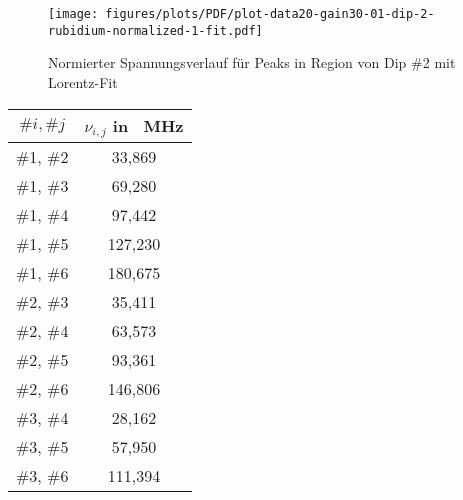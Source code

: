 \begin{figure}[H]
    \centering
    \texttt{[image: figures/plots/PDF/plot-data20-gain30-01-dip-2-rubidium-normalized-1-fit.pdf]}
    \caption{Normierter Spannungsverlauf für Peaks in Region von Dip \textcolor{green!50!black}{\#2} mit Lorentz-Fit}
    \label{fig:plot-data20-gain30-01-dip-2-rubidium-normalized-1-fit}
\end{figure}

\begin{table}[H]
    \begin{minipage}{8cm}
        \centering
        \begin{tabular}{|c|c|}
            \hline
            $\#i, \#j$      &       $\nu_{i,j}$ in \SI{}{\mega \hertz} \\
            \hline
            \hline
            \cellcolor{green!40} \#1, \#2       &   \cellcolor{green!40}     33,869         \\
            \hline
            \cellcolor{red!20}   \#1, \#3       &   \cellcolor{red!20}       69,280         \\
            \hline
            \cellcolor{gray!20}  \#1, \#4       &   \cellcolor{gray!20}      97,442         \\
            \hline
            \cellcolor{red!20}   \#1, \#5       &   \cellcolor{red!20}      127,230         \\
            \hline
            \cellcolor{gray!20}  \#1, \#6       &   \cellcolor{gray!20}     180,675         \\
            \hline
            \cellcolor{red!20}   \#2, \#3       &   \cellcolor{red!20}       35,411         \\
            \hline
            \cellcolor{green!40} \#2, \#4       &   \cellcolor{green!40}     63,573         \\
            \hline
            \cellcolor{red!20}   \#2, \#5       &   \cellcolor{red!20}       93,361         \\
            \hline
            \cellcolor{gray!20}  \#2, \#6       &   \cellcolor{gray!20}     146,806         \\
            \hline
            \cellcolor{red!20}   \#3, \#4       &   \cellcolor{red!20}       28,162         \\
            \hline
            \cellcolor{red!20}   \#3, \#5       &   \cellcolor{red!20}       57,950         \\
            \hline          
            \cellcolor{red!20}   \#3, \#6       &   \cellcolor{red!20}      111,394         \\

\end{tabular}
\end{minipage}
\end{table}
